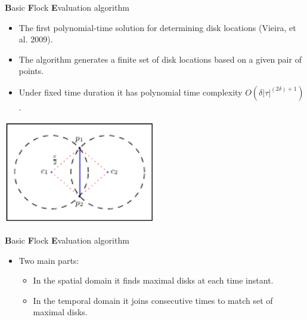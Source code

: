 \begin{frame}{\textbf{B}asic \textbf{F}lock \textbf{E}valuation algorithm}
    \begin{itemize}
        \item The first polynomial-time solution for determining disk locations (Vieira, et al. 2009).
        \item The algorithm generates a finite set of disk locations based on a given pair of points.
        \item Under fixed time duration it has polynomial time complexity $O(\delta|\tau|^{(2\delta) + 1})$.
    \end{itemize}

    \centering
    \includegraphics[width=0.5\textwidth]{figures/theorem}
\end{frame}

\begin{frame}{\textbf{B}asic \textbf{F}lock \textbf{E}valuation algorithm}
    \begin{itemize}
        \item Two main parts:
        \begin{itemize}
            \item In the spatial domain it finds maximal disks at each time instant.
            \item In the temporal domain it joins consecutive times to match set of maximal disks.
        \end{itemize}
    \end{itemize}
\end{frame}

%

